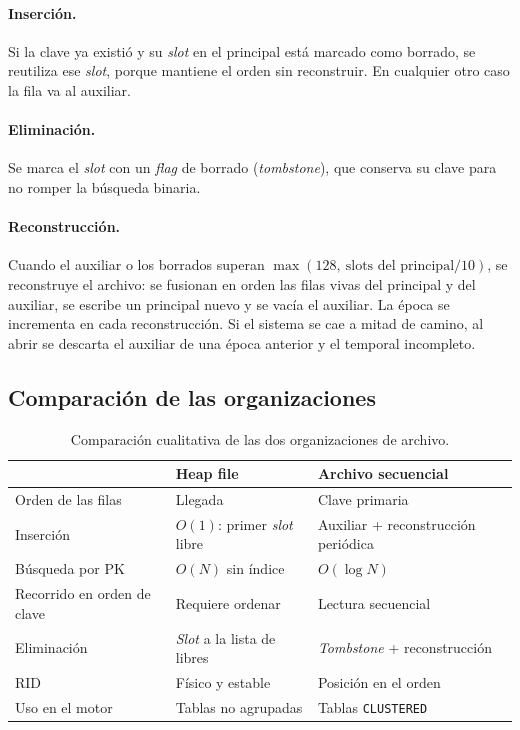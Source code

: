 \documentclass[11pt,a4paper]{article}
\begin{document}
\paragraph{Inserción.} Si la clave ya existió y su \emph{slot} en el principal está marcado como borrado, se reutiliza ese \emph{slot}, porque mantiene el orden sin reconstruir. En cualquier otro caso la fila va al auxiliar.

\paragraph{Eliminación.} Se marca el \emph{slot} con un \emph{flag} de borrado (\emph{tombstone}), que conserva su clave para no romper la búsqueda binaria.

\paragraph{Reconstrucción.} Cuando el auxiliar o los borrados superan $\max(128,\ \text{slots del principal}/10)$, se reconstruye el archivo: se fusionan en orden las filas vivas del principal y del auxiliar, se escribe un principal nuevo y se vacía el auxiliar. La época se incrementa en cada reconstrucción. Si el sistema se cae a mitad de camino, al abrir se descarta el auxiliar de una época anterior y el temporal incompleto.

\subsection{Comparación de las organizaciones}

\begin{table}[H]
  \centering
  \small
  \begin{tabular}{@{}lll@{}}
    \toprule
    & \textbf{Heap file} & \textbf{Archivo secuencial} \\
    \midrule
    Orden de las filas & Llegada & Clave primaria \\
    Inserción & $O(1)$: primer \emph{slot} libre & Auxiliar + reconstrucción periódica \\
    Búsqueda por PK & $O(N)$ sin índice & $O(\log N)$ \\
    Recorrido en orden de clave & Requiere ordenar & Lectura secuencial \\
    Eliminación & \emph{Slot} a la lista de libres & \emph{Tombstone} + reconstrucción \\
    RID & Físico y estable & Posición en el orden \\
    Uso en el motor & Tablas no agrupadas & Tablas \texttt{CLUSTERED} \\
    \bottomrule
  \end{tabular}
  \caption{Comparación cualitativa de las dos organizaciones de archivo.}
\end{table}
\end{document}
